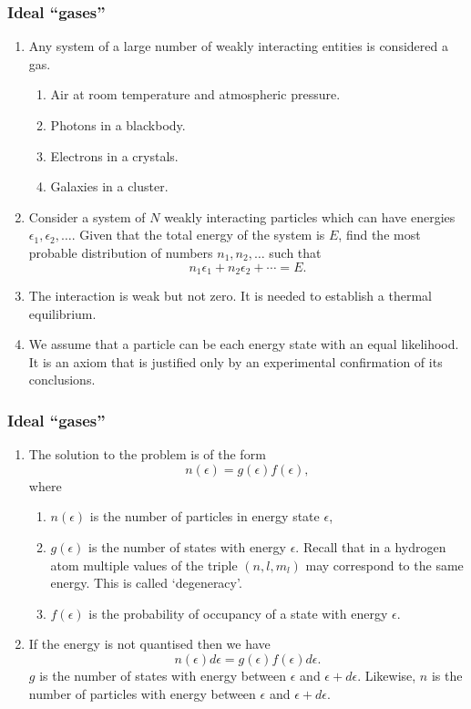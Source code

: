 \documentclass{beamer}
\begin{document}
\begin{frame}
\frametitle{Ideal ``gases''}
\begin{enumerate}
\item Any system of a large number of weakly interacting entities is considered
a gas.
\begin{enumerate}
\item Air at room temperature and atmospheric pressure.
\item Photons in a blackbody.
\item Electrons in a crystals.
\item Galaxies in a cluster.
\end{enumerate}
\item Consider a system of $N$ weakly interacting particles which can have 
energies $\epsilon_1, \epsilon_2, \ldots$. Given that the total energy of the 
system is $E$, find the most probable distribution of numbers $n_1, n_2, \ldots$
such that
\begin{equation}\label{e1}
n_1\epsilon_1 + n_2\epsilon_2 + \cdots = E.
\end{equation}
\item The interaction is weak but not zero. It is needed to establish a thermal
equilibrium.
\item We assume that a particle can be each energy state with an equal 
likelihood. It is an axiom that is justified only by an experimental 
confirmation of its conclusions.
\end{enumerate}
\end{frame}

\begin{frame}
\frametitle{Ideal ``gases''}
\begin{enumerate}
\item The solution to the problem is of the form
\begin{equation}\label{e2}
n(\epsilon) = g(\epsilon)f(\epsilon),
\end{equation}
where
\begin{enumerate}
\item $n(\epsilon)$ is the number of particles in energy state $\epsilon$,
\item $g(\epsilon)$ is the number of states with energy $\epsilon$. Recall that 
in a hydrogen atom multiple values of the triple $(n, l, m_l)$ may correspond
to the same energy. This is called `degeneracy'.
\item $f(\epsilon)$ is the probability of occupancy of a state with energy
$\epsilon$.
\end{enumerate}
\item If the energy is not quantised then we have
\begin{equation}\label{e3}
n(\epsilon)d\epsilon = g(\epsilon)f(\epsilon)d\epsilon.
\end{equation}
$g$ is the number of states with energy between $\epsilon$ and $\epsilon + 
d\epsilon$. Likewise, $n$ is the number of particles with energy between 
$\epsilon$ and $\epsilon + d\epsilon$.
\end{enumerate}
\end{frame}
\end{document}
